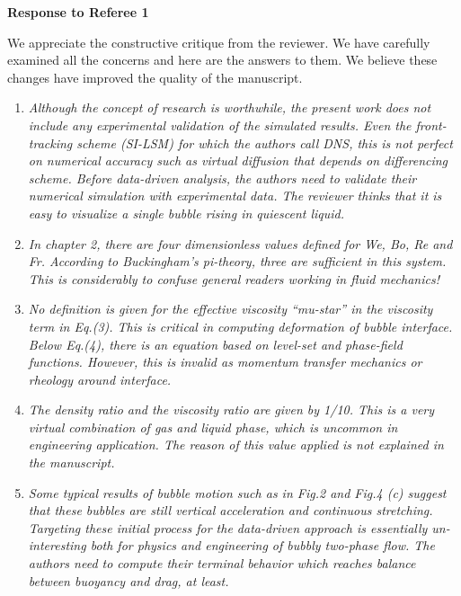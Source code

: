 \documentclass[a4paper]{article}
\begin{document}
{\Large \bf {Response to Referee 1}}
\vspace{1cm}

{\textcolor{Olivegreen}{
We appreciate the constructive critique from the reviewer. We have carefully examined all the concerns and here are the answers to them. We believe these changes have improved the quality of the manuscript.
}}


\begin{enumerate}
\item
\textit{Although the concept of research is worthwhile, the present work does not include any experimental validation of the simulated results. Even the front-tracking scheme (SI-LSM) for which the authors call DNS, this is not perfect on numerical accuracy such as virtual diffusion that depends on differencing scheme. Before data-driven analysis, the authors need to validate their numerical simulation with experimental data. The reviewer thinks that it is easy to visualize a single bubble rising in quiescent liquid.}
\vspace{.2cm}


\item
\textit{In chapter 2, there are four dimensionless values defined for We, Bo, Re and Fr. According to Buckingham's pi-theory, three are sufficient in this system. This is considerably to confuse general readers working in fluid mechanics!}
\vspace{.2cm}


\item
\textit{No definition is given for the effective viscosity ``mu-star'' in the viscosity term in Eq.(3). This is critical in computing deformation of bubble interface. Below Eq.(4), there is an equation based on level-set and phase-field functions. However, this is invalid as momentum transfer mechanics or rheology around interface.}
\vspace{.2cm}


\item
\textit{The density ratio and the viscosity ratio are given by 1/10. This is a very virtual combination of gas and liquid phase, which is uncommon in engineering application. The reason of this value applied is not explained in the manuscript.}
\vspace{.2cm}


\item
\textit{Some typical results of bubble motion such as in Fig.2 and Fig.4 (c) suggest that these bubbles are still vertical acceleration and continuous stretching. Targeting these initial process for the data-driven approach is essentially un-interesting both for physics and engineering of bubbly two-phase flow. The authors need to compute their terminal behavior which reaches balance between buoyancy and drag, at least.}
\vspace{.2cm}




\end{enumerate}
\end{document}

